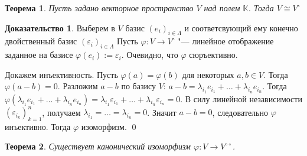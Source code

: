 \documentclass[a4paper, 12pt]{article}
\newtheorem*{theorem}{\hspace*{\parindent}Теорема}
\theoremstyle{definition}
\newtheorem*{prof}{\hspace*{\parindent}Доказательство}
\begin{document}
\begin{theorem}
    Пусть задано векторное пространство $V$ над полем $\mathbb{K}$. Тогда $V \cong V^\circ$
\end{theorem}

\begin{prof}
    Выберем в $V$ базис $(e_i)_{i \in \Lambda}$ и соответсвующий ему конечно двойственный базис $(\varepsilon_i)_{i \in \Lambda}$
    Пусть $\varphi: V \to V^\circ$ "--- линейное отображение заданное на базисе $\varphi(e_i) := \varepsilon_i$. Очевидно, что $\varphi$ сюръективно.

    Докажем инъективность. Пусть $\varphi(a) = \varphi(b)$ для некоторых $a, b \in V$. Тогда $\varphi(a-b) = 0$. Разложим $a-b$ по базису $V$: $a-b = \lambda_{i_1}e_{i_1} + \dots + \lambda_{i_n}e_{i_n}$.
    Тогда $\varphi(\lambda_{i_1}e_{i_1} + \dots + \lambda_{i_n}e_{i_n}) = \lambda_{i_1}\varepsilon_{i_1} + \dots + \lambda_{i_n}\varepsilon_{i_n} = 0$. В силу линейной независимости $(\varepsilon_{i_k})_{k=1}^n$, получаем $\lambda_{i_1} =\dots=\lambda_{i_n} = 0$. Значит $a-b =0$, следовательно $\varphi$ инъективно. Тогда $\varphi$ изоморфизм. \qed
\end{prof}

\begin{theorem}
    Существует канонический изоморфизм $\varphi: V \to V^{\circ\circ}$.
\end{theorem}
\end{document}

